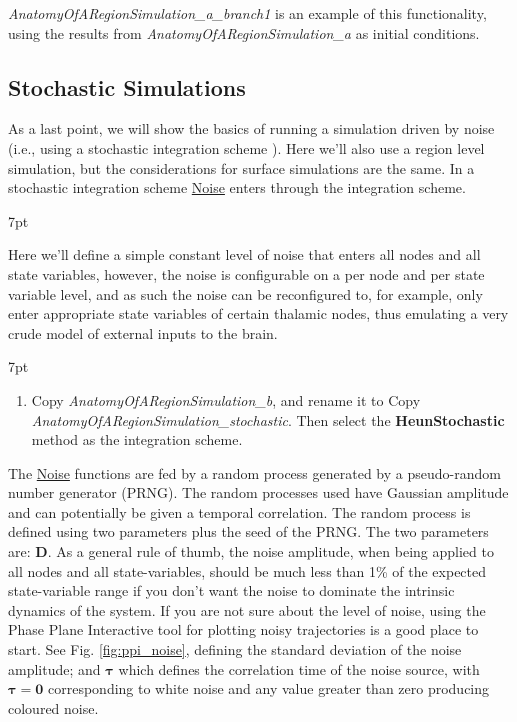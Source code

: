 \documentclass{tufte-handout}
\newenvironment{simulation}{%
  \def\FrameCommand{%
    \hspace{1pt}%
    {\color{ForestGreen}\vrule width 2pt}%
    {\color{simulationshade}\vrule width 4pt}%
    \colorbox{simulationshade}%
  }%
  \MakeFramed{\advance\hsize-\width\FrameRestore}%
  \noindent\hspace{-4.55pt}%
  \begin{adjustwidth}{}{7pt}%
  \vspace{2pt}\vspace{2pt}%
}
{%
  \vspace{2pt}\end{adjustwidth}\endMakeFramed%
}
\newenvironment{blah}{%
  \def\FrameCommand{%
    \hspace{1pt}%
    {\color{DarkOrange}\vrule width 2pt}%
    {\color{PeachPuff}\vrule width 4pt}%
    \colorbox{PeachPuff}%
  }%
  \MakeFramed{\advance\hsize-\width\FrameRestore}%
  \noindent\hspace{-4.55pt}%
  \begin{adjustwidth}{}{7pt}%
  \vspace{2pt}\vspace{2pt}%
}
{%
  \vspace{2pt}\end{adjustwidth}\endMakeFramed%
}
\begin{document}
\textit{AnatomyOfARegionSimulation\_a\_branch1} is an example of this functionality, using the results from \textit{AnatomyOfARegionSimulation\_a} as initial conditions. 

\subsection{Stochastic Simulations}\label{sec:noisy_simulations}


As a last point, we will show the basics of running a simulation driven by
noise (i.e., using a stochastic integration scheme ). Here we'll also use a region level simulation, but the
considerations for surface simulations are the same. In a stochastic
integration scheme \underline{Noise} enters through the integration scheme.

\begin{blah}
\begin{itemize}
Here we'll define a simple constant level of noise that enters all
nodes and all state variables, however, the noise is configurable on a per
node and per state variable level, and as such the noise can be reconfigured
to, for example, only enter appropriate state variables of certain thalamic
nodes, thus emulating a very crude model of external inputs to the brain. 
\end{itemize}
\end{blah}

\begin{simulation}
\begin{enumerate}
\item Copy \textit{AnatomyOfARegionSimulation\_b}, and rename it to Copy \textit{AnatomyOfARegionSimulation\_stochastic}.
Then select the \textbf{HeunStochastic} method as the integration scheme.  
\end{enumerate}
\end{simulation}

The \underline{Noise} functions are fed by a random process generated by a
pseudo-random number generator (PRNG). The random processes used have Gaussian
amplitude and can potentially be given a temporal correlation. The random
process is defined using two parameters plus the seed of the PRNG. The two
parameters are: $\mathbf{D}$. As a general rule of thumb, the noise
amplitude, when being applied to all nodes and all state-variables, should be
much less than 1\% of the expected state-variable range if you don't want the
noise to dominate the intrinsic dynamics of the system. If you are not sure
about the level of noise, using the Phase Plane Interactive tool for plotting
noisy trajectories is a good place to start. See Fig. \ref{fig:ppi_noise},
defining the standard deviation of the noise amplitude; and
$\boldsymbol{\tau}$ which defines the correlation time of the noise source,
with $\boldsymbol{\tau = 0}$ corresponding to white noise and any value
greater than zero producing coloured noise.
\end{document}
